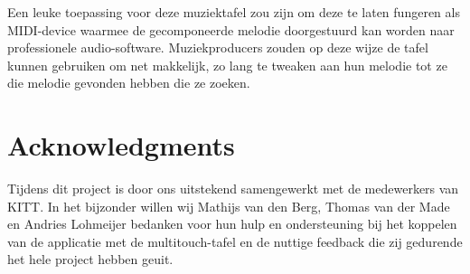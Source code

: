\documentclass{acm}
\begin{document}
Een leuke toepassing voor deze muziektafel zou zijn om deze te laten fungeren als MIDI-device waarmee de gecomponeerde melodie doorgestuurd kan worden naar professionele audio-software. Muziekproducers zouden op deze wijze de tafel kunnen gebruiken om net makkelijk, zo lang te tweaken aan hun melodie tot ze die melodie gevonden hebben die ze zoeken.

\section{Acknowledgments}
Tijdens dit project is door ons uitstekend samengewerkt met de medewerkers van KITT. In het bijzonder willen wij Mathijs van den Berg, Thomas van der Made en Andries Lohmeijer bedanken voor hun hulp en ondersteuning bij het koppelen van de applicatie met de multitouch-tafel en de nuttige feedback die zij gedurende het hele project hebben geuit.
\end{document}
